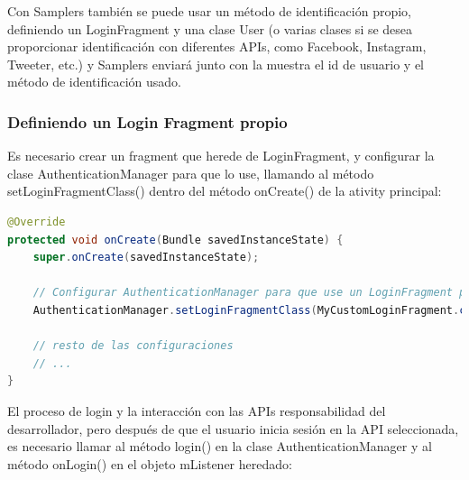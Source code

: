 Con Samplers también se puede usar un método de identificación propio, definiendo un LoginFragment y una clase User (o varias clases si se desea proporcionar identificación con diferentes APIs, como Facebook, Instagram, Tweeter, etc.) y Samplers enviará junto con la muestra el id de usuario y el método de identificación usado.


\subsubsection{Definiendo un Login Fragment propio}

Es necesario crear un fragment que herede de LoginFragment, y configurar la clase AuthenticationManager para que lo use, llamando al método setLoginFragmentClass() dentro del método onCreate() de la ativity principal:

\begin{lstlisting}[language=Java, frame=tlbr, caption=Ejemplo de como configurar un LoginFragment propio (línea 6).]	
@Override
protected void onCreate(Bundle savedInstanceState) {
	super.onCreate(savedInstanceState);

	// Configurar AuthenticationManager para que use un LoginFragment propio
	AuthenticationManager.setLoginFragmentClass(MyCustomLoginFragment.class);
  
	// resto de las configuraciones
	// ...
}
\end{lstlisting}


El proceso de login y la interacción con las APIs responsabilidad del desarrollador, pero después de que el usuario inicia sesión en la API seleccionada, es necesario llamar al método login() en la clase AuthenticationManager y al método onLogin() en el objeto mListener heredado:

